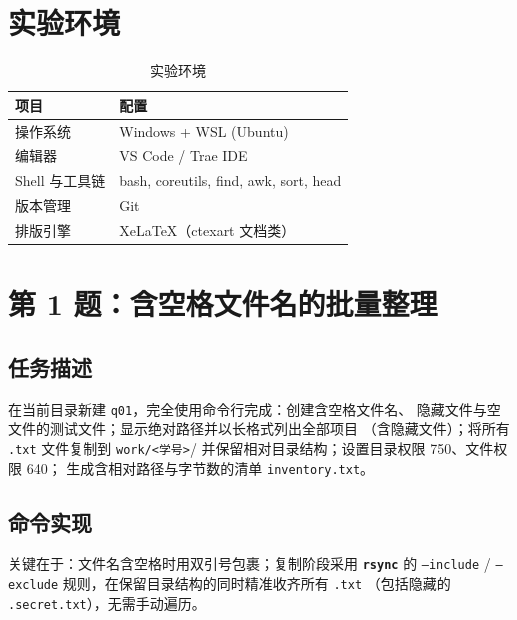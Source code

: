 \documentclass[a4paper,11pt]{ctexart}
\begin{document}
\section{实验环境}

\begin{table}[htbp]
  \centering
  \caption{实验环境}\label{tab:env}
  \begin{tabular}{ll}
    \toprule
    项目 & 配置 \\
    \midrule
    操作系统 & Windows + WSL (Ubuntu) \\
    编辑器 & VS Code / Trae IDE \\
    Shell 与工具链 & bash, coreutils, find, awk, sort, head \\
    版本管理 & Git \\
    排版引擎 & XeLaTeX（ctexart 文档类） \\
    \bottomrule
  \end{tabular}
\end{table}

\section{第 1 题：含空格文件名的批量整理}

\subsection{任务描述}

在当前目录新建 \texttt{q01}，完全使用命令行完成：创建含空格文件名、
隐藏文件与空文件的测试文件；显示绝对路径并以长格式列出全部项目
（含隐藏文件）；将所有 \texttt{.txt} 文件复制到 \texttt{work/<学号>}/
并保留相对目录结构；设置目录权限 750、文件权限 640；
生成含相对路径与字节数的清单 \texttt{inventory.txt}。

\subsection{命令实现}

关键在于：文件名含空格时用双引号包裹；复制阶段采用
\textbf{\texttt{rsync}} 的 \texttt{--include} / \texttt{--exclude}
规则，在保留目录结构的同时精准收齐所有 \texttt{.txt}
（包括隐藏的 \texttt{.secret.txt}），无需手动遍历。
\end{document}
